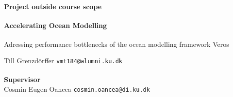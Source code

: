 \documentclass[a4paper,oneside]{memoir}
\begin{document}
    \thispagestyle{empty}
    \begin{adjustwidth}{-3cm}{-1.5cm}
    \vspace*{-1cm}
    \textbf{\Huge Project outside course scope} \\
    \vspace*{2.5cm} \\
    \textbf{\Huge Accelerating Ocean Modelling} \\
    \vspace*{.1cm} \\
    {\huge Adressing performance bottlenecks of the ocean modelling framework Veros} \\
    \begin{tabbing}
    Till Grenzdörffer \hspace{1cm} \= \texttt{vmt184@alumni.ku.dk} \\
    \\[12cm]
    \textbf{\Large Supervisor} \\
    Cosmin Eugen Oancea \> \texttt{cosmin.oancea@di.ku.dk} \\
    \end{tabbing}
    \end{adjustwidth}
    \newpage
    \ClearWallPaper


\iffalse %
\end{document}

